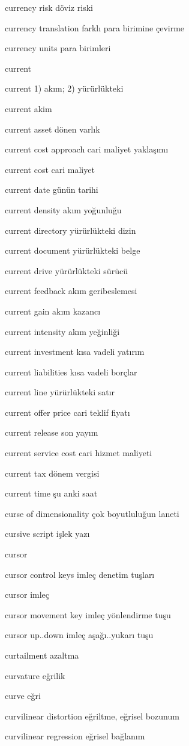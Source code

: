 \documentclass[12pt,fleqn]{article}\usepackage{../../common}
\begin{document}
currency risk döviz riski

currency translation farklı para birimine çevirme

currency units para birimleri

current

current 1) akım; 2) yürürlükteki

current akim

current asset dönen varlık

current cost approach cari maliyet yaklaşımı

current cost cari maliyet

current date günün tarihi

current density akım yoğunluğu

current directory yürürlükteki dizin

current document yürürlükteki belge

current drive yürürlükteki sürücü

current feedback akım geribeslemesi

current gain akım kazancı

current intensity akım yeğinliği

current investment kısa vadeli yatırım

current liabilities kısa vadeli borçlar

current line yürürlükteki satır

current offer price cari teklif fiyatı

current release son yayım

current service cost cari hizmet maliyeti

current tax dönem vergisi

current time şu anki saat

curse of dimensionality çok boyutluluğun laneti

cursive script işlek yazı

cursor

cursor control keys imleç denetim tuşları

cursor imleç

cursor movement key imleç yönlendirme tuşu

cursor up..down imleç aşağı..yukarı tuşu

curtailment azaltma

curvature eğrilik

curve eğri

curvilinear distortion eğriltme, eğrisel bozunum

curvilinear regression eğrisel bağlanım
\end{document}
